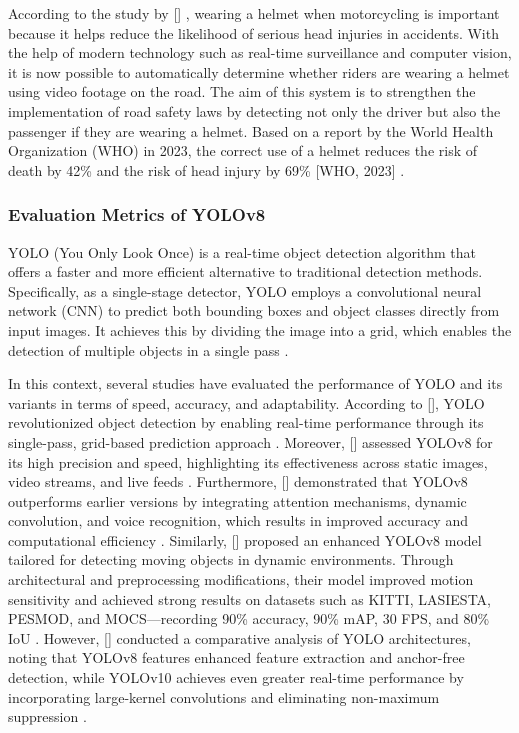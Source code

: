 \begin{refsection}
According to the study by \citeauthor{bhatt2024ai} [\citeyear{bhatt2024ai}] , wearing a helmet when motorcycling is important because it helps reduce the likelihood of serious head injuries in accidents. With the help of modern technology such as real-time surveillance and computer vision, it is now possible to automatically determine whether riders are wearing a helmet using video footage on the road. The aim of this system is to strengthen the implementation of road safety laws by detecting not only the driver but also the passenger if they are wearing a helmet. Based on a report by the World Health Organization (WHO) in 2023, the correct use of a helmet reduces the risk of death by 42\% and the risk of head injury by 69\% [WHO, 2023] \cite{bhatt2024ai}.

\subsubsection{Evaluation Metrics of YOLOv8}
    YOLO (You Only Look Once) is a real-time object detection algorithm that offers a faster and more efficient alternative to traditional detection methods. Specifically, as a single-stage detector, YOLO employs a convolutional neural network (CNN) to predict both bounding boxes and object classes directly from input images. It achieves this by dividing the image into a grid, which enables the detection of multiple objects in a single pass \cite {kili2023yolo}. 

In this context, several studies have evaluated the performance of YOLO and its variants in terms of speed, accuracy, and adaptability. According to \citeauthor{prakash2024study} [\citeyear{prakash2024study}], YOLO revolutionized object detection by enabling real-time performance through its single-pass, grid-based prediction approach \cite{prakash2024study}. Moreover,\citeauthor{karthika2024automated} [\citeyear{karthika2024automated}] assessed YOLOv8 for its high precision and speed, highlighting its effectiveness across static images, video streams, and live feeds \cite{karthika2024automated}. Furthermore,\citeauthor{Varghese2024} [\citeyear{Varghese2024}] demonstrated that YOLOv8 outperforms earlier versions by integrating attention mechanisms, dynamic convolution, and voice recognition, which results in improved accuracy and computational efficiency \cite{Varghese2024}. Similarly, \citeauthor{Safaldin2024} [\citeyear{Safaldin2024}] proposed an enhanced YOLOv8 model tailored for detecting moving objects in dynamic environments. Through architectural and preprocessing modifications, their model improved motion sensitivity and achieved strong results on datasets such as KITTI, LASIESTA, PESMOD, and MOCS—recording 90\% accuracy, 90\% mAP, 30 FPS, and 80\% IoU \cite{Safaldin2024}. However,\citeauthor{hussain2024yolo} [\citeyear{hussain2024yolo}] conducted a comparative analysis of YOLO architectures, noting that YOLOv8 features enhanced feature extraction and anchor-free detection, while YOLOv10 achieves even greater real-time performance by incorporating large-kernel convolutions and eliminating non-maximum suppression \cite{hussain2024yolo}.
     

\end{refsection}
